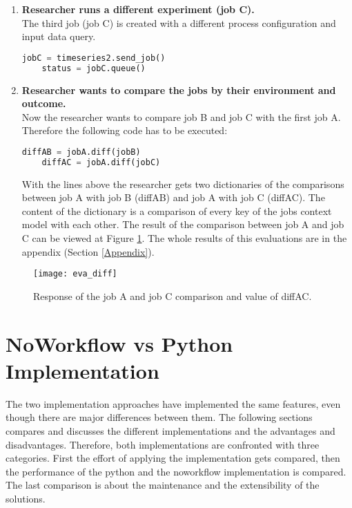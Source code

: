 \documentclass[draft,final]{vutinfth} %
\begin{document}
\begin{enumerate}
	\item \textbf{Researcher runs a different experiment (job C).}\\
	The third job (job C) is created with a different process configuration and input data query.
	\begin{lstlisting}[frame=single, language=Python]
	jobC = timeseries2.send_job()
	status = jobC.queue()
	\end{lstlisting}   
	\item \textbf{Researcher wants to compare the jobs by their environment and outcome.}\\
	Now the researcher wants to compare job B and job C with the first job A. Therefore the following code has to be executed:
	\begin{lstlisting}[frame=single, language=Python]
	diffAB = jobA.diff(jobB)
	diffAC = jobA.diff(jobC)
	\end{lstlisting}  
	With the lines above the researcher gets two dictionaries of the comparisons between job A with job B (diffAB) and job A with job C (diffAC). The content of the dictionary is a comparison of every key of the jobs context model with each other. The result of the comparison between job A and job C can be viewed at Figure \ref{fig:eva_diff}. The whole results of this evaluations are in the appendix (Section \ref{Appendix}).   
\end{enumerate}

\begin{figure}[h]
	\centering
	\texttt{[image: eva\_diff]}
	\caption{Response of the job A and job C comparison and value of diffAC.}
	\label{fig:eva_diff} %
\end{figure}


\section{NoWorkflow vs Python Implementation}\label{Evaluation:NvsP}
The two implementation approaches have implemented the same features, even though there are major differences between them. The following sections compares and discusses the different implementations and the advantages and disadvantages. Therefore, both implementations are confronted with three categories. First the effort of applying the implementation gets compared, then the performance of the python and the noworkflow implementation is compared. The last comparison is about the maintenance and the extensibility of the solutions. 
\end{document}
